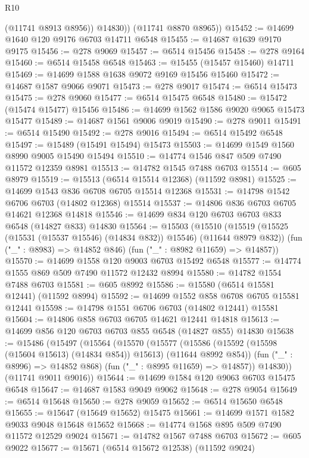 \begin{lexlean}{R10}
\begin{coremodule}
            (@11741 @8913 @8956))
          @14830))
      (@11741 @8870 @8965))
@15452 := @14699 @1640 @120 @9176 @6703 @14711 @6548
@15455 := @14687 @1639 @9170 @9175
@15456 := @278 @9069
@15457 := @6514 @15456
@15458 := @278 @9164
@15460 := @6514 @15458 @6548
@15463 := @15455 (@15457 @15460) @14711
@15469 := @14699 @1588 @1638 @9072 @9169 @15456 @15460
@15472 := @14687 @1587 @9066 @9071
@15473 := @278 @9017
@15474 := @6514 @15473
@15475 := @278 @9060
@15477 := @6514 @15475 @6548
@15480 := @15472 (@15474 @15477) @15456
@15486 := @14699 @1562 @1586 @9020 @9065 @15473 @15477
@15489 := @14687 @1561 @9006 @9019
@15490 := @278 @9011
@15491 := @6514 @15490
@15492 := @278 @9016
@15494 := @6514 @15492 @6548
@15497 := @15489 (@15491 @15494) @15473
@15503 := @14699 @1549 @1560 @8990 @9005 @15490 @15494
@15510 := @14774 @1546 @847 @509 @7490 @11572 @12359 @8981
@15513 := @14782 @1545 @7488 @6703
@15514 := @605 @8979
@15519 := @15513 (@6514 @15514 @12368) (@11592 @8981)
@15525 := @14699 @1543 @836 @6708 @6705 @15514 @12368
@15531 := @14798 @1542 @6706 @6703 (@14802 @12368) @15514
@15537 := @14806 @836 @6703 @6705 @14621 @12368 @14818
@15546 := @14699 @834 @120 @6703 @6703 @833 @6548 (@14827 @833) @14830
@15564 := @15503
    (@15510
      (@15519 (@15525 (@15531 (@15537 @15546) (@14834 @832)) @15546) (@11644 @8979 @832))
      (fun ("_" : @8983) => @14852 @846)
      (fun ("_" : @8982 @11659) => @14857))
@15570 := @14699 @1558 @120 @9003 @6703 @15492 @6548
@15577 := @14774 @1555 @869 @509 @7490 @11572 @12432 @8994
@15580 := @14782 @1554 @7488 @6703
@15581 := @605 @8992
@15586 := @15580 (@6514 @15581 @12441) (@11592 @8994)
@15592 := @14699 @1552 @858 @6708 @6705 @15581 @12441
@15598 := @14798 @1551 @6706 @6703 (@14802 @12441) @15581
@15604 := @14806 @858 @6703 @6705 @14621 @12441 @14818
@15613 := @14699 @856 @120 @6703 @6703 @855 @6548 (@14827 @855) @14830
@15638 := @15486
    (@15497
      (@15564
        (@15570
          (@15577
            (@15586 (@15592 (@15598 (@15604 @15613) (@14834 @854)) @15613) (@11644 @8992 @854))
            (fun ("_" : @8996) => @14852 @868)
            (fun ("_" : @8995 @11659) => @14857))
          @14830))
      (@11741 @9011 @9016))
@15644 := @14699 @1584 @120 @9063 @6703 @15475 @6548
@15647 := @14687 @1583 @9049 @9062
@15648 := @278 @9054
@15649 := @6514 @15648
@15650 := @278 @9059
@15652 := @6514 @15650 @6548
@15655 := @15647 (@15649 @15652) @15475
@15661 := @14699 @1571 @1582 @9033 @9048 @15648 @15652
@15668 := @14774 @1568 @895 @509 @7490 @11572 @12529 @9024
@15671 := @14782 @1567 @7488 @6703
@15672 := @605 @9022
@15677 := @15671 (@6514 @15672 @12538) (@11592 @9024)

\end{coremodule}
\end{lexlean}
